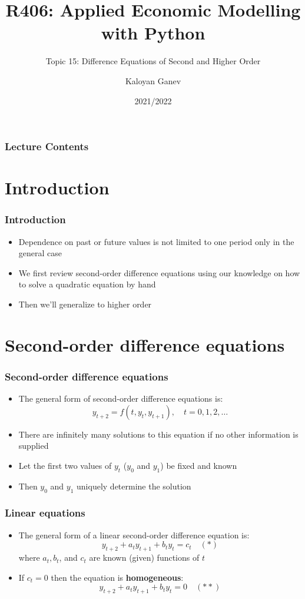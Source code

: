 \documentclass[10pt,usenames,dvipsnames]{beamer}
\title{R406: Applied Economic Modelling with Python}
\subtitle{Topic 15: \textcolor{myred}{Difference Equations of Second and Higher Order}}
\author{Kaloyan Ganev}
\date{2021/2022}
\theoremstyle{definition}
\begin{document}
\maketitle

\begin{frame}[fragile]
\frametitle{Lecture Contents}
\tableofcontents
\end{frame}

\section{Introduction}
\begin{frame}[fragile]
\frametitle{Introduction}
\begin{itemize}
	\item Dependence on past or future values is not limited to one period only in the general case
	\item We first review second-order difference equations using our knowledge on how to solve a quadratic equation by hand
	\item Then we'll generalize to higher order
\end{itemize}
\end{frame}

\section{Second-order difference equations}
\begin{frame}[fragile]
\frametitle{Second-order difference equations}
\begin{itemize}
	\item The general form of second-order difference equations is:
	\[
		y_{t+2} = f(t, y_{t}, y_{t+1}),\quad t = 0,1,2,\ldots
	\]
	\item There are infinitely many solutions to this equation if no other information is supplied
	\item Let the first two values of $y_{t}$ ($y_{0}$ and $y_{1}$) be fixed and known
	\item Then $y_{0}$ and $y_{1}$ uniquely determine the solution
\end{itemize}
\end{frame}

\begin{frame}[fragile]
\frametitle{Linear equations}
\begin{itemize}
	\item The general form of a linear second-order difference equation is:
	\[
		y_{t+2} + a_{t}y_{t+1} + b_{t}y_{t} = c_{t} \quad (*)
	\]
	where $a_{t},b_{t}$, and $c_{t}$ are known (given) functions of $t$
	\item If $c_{t} = 0$ then the equation is \textbf{homogeneous}:
	\[
		y_{t+2} + a_{t}y_{t+1} + b_{t}y_{t} = 0 \quad (**)
	\]
\end{itemize}
\end{frame}
\end{document}
